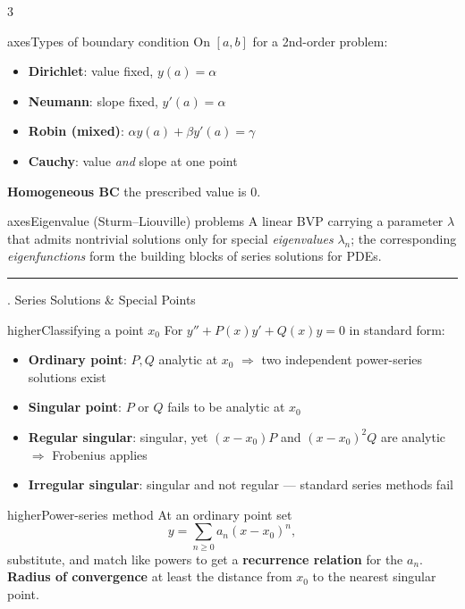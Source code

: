 \documentclass[10pt]{article}
\newcommand{\lab}[1]{\textcolor{ink}{\sffamily\footnotesize\textbf{#1}}\;}
\newcommand{\sect}[2]{%
  \begin{tcolorbox}[blanker, breakable, before skip=2pt, after skip=2pt]
    \begingroup\sffamily\bfseries\normalsize\color{#1}%
    {\color{#1}\rule[-1pt]{3pt}{12pt}}\;#2\endgroup
    \par\vspace{1pt}{\color{#1}\hrule height 1pt}
\end{tcolorbox}}
\begin{document}
\begin{multicols}{3}
  \begin{card}{axes}{Types of boundary condition}
    On \([a,b]\) for a 2nd-order problem:
    \begin{itemize}
      \item \textbf{Dirichlet}: value fixed, \(y(a)=\alpha\)
      \item \textbf{Neumann}: slope fixed, \(y'(a)=\alpha\)
      \item \textbf{Robin (mixed)}: \(\alpha y(a)+\beta y'(a)=\gamma\)
      \item \textbf{Cauchy}: value \emph{and} slope at one point
    \end{itemize}
    \lab{Homogeneous BC} the prescribed value is \(0\).
  \end{card}

  \begin{card}{axes}{Eigenvalue (Sturm--Liouville) problems}
    A linear BVP carrying a parameter \(\lambda\) that admits nontrivial solutions only for special \emph{eigenvalues} \(\lambda_{n}\); the corresponding \emph{eigenfunctions} form the building blocks of series solutions for PDEs.
  \end{card}

  \columnbreak
  \sect{higher}{7.\; Series Solutions \& Special Points}

  \begin{card}{higher}{Classifying a point \(x_{0}\)}
    For \(y''+P(x)y'+Q(x)y=0\) in standard form:
    \begin{itemize}
      \item \textbf{Ordinary point}: \(P,Q\) analytic at \(x_{0}\) \(\Rightarrow\) two independent power-series solutions exist
      \item \textbf{Singular point}: \(P\) or \(Q\) fails to be analytic at \(x_{0}\)
      \item \textbf{Regular singular}: singular, yet \((x{-}x_{0})P\) and \((x{-}x_{0})^{2}Q\) are analytic \(\Rightarrow\) Frobenius applies
      \item \textbf{Irregular singular}: singular and not regular --- standard series methods fail
    \end{itemize}
  \end{card}

  \begin{card}{higher}{Power-series method}
    At an ordinary point set
    \[ y=\sum_{n\ge 0} a_{n} (x-x_{0})^{n}, \]
    substitute, and match like powers to get a \textbf{recurrence relation} for the \(a_{n}\).\\[2pt]
    \lab{Radius of convergence} at least the distance from \(x_{0}\) to the nearest singular point.
  \end{card}


\end{multicols}
\end{document}
